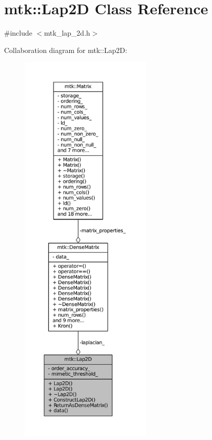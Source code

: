 \hypertarget{classmtk_1_1Lap2D}{\section{mtk\+:\+:Lap2\+D Class Reference}
\label{classmtk_1_1Lap2D}
}


{\ttfamily \#include $<$mtk\+\_\+lap\+\_\+2d.\+h$>$}



Collaboration diagram for mtk\+:\+:Lap2\+D\+:\nopagebreak
\begin{figure}[H]
\begin{center}
\leavevmode
\includegraphics[height=550pt]{classmtk_1_1Lap2D__coll__graph}
\end{center}
\end{figure}

